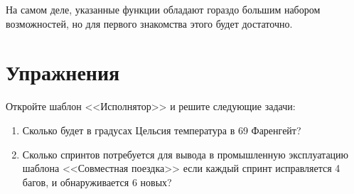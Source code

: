 \documentclass[../index.tex]{subfiles}
\begin{document}
	На самом деле, указанные функции обладают гораздо большим набором возможностей, но для первого знакомства этого будет достаточно. 
				
	\section{Упражнения}
	
	Откройте шаблон <<Исполнятор>> и решите следующие задачи:
	
	\begin{enumerate}
		\item Сколько будет в градусах Цельсия температура в 69 Фаренгейт?
		
		\item Сколько спринтов потребуется для вывода в промышленную эксплуатацию шаблона <<Совместная поездка>> если каждый спринт исправляется 4 багов, и обнаруживается 6 новых?
    \end{enumerate}
\end{document}

